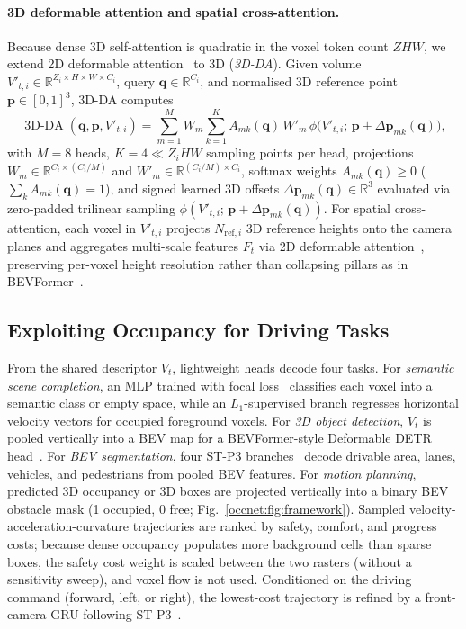 \paragraph{3D deformable attention and spatial cross-attention.} Because dense 3D self-attention is quadratic in the voxel token count $ZHW$, we extend 2D deformable attention~\cite{Zhu2021DeformableDD} to 3D (\emph{3D-DA}). Given volume $V'_{t,i}\in\mathbb{R}^{Z_i\times H\times W\times C_i}$, query $\boldsymbol{q}\in\mathbb{R}^{C_i}$, and normalised 3D reference point $\boldsymbol{p}\in[0,1]^3$, 3D-DA computes
\begin{equation}
  \operatorname{3D-DA}(\boldsymbol{q},\boldsymbol{p},V'_{t,i})
  = \sum_{m=1}^{M} W_m \sum_{k=1}^{K} A_{mk}(\boldsymbol{q})\, W'_m\, \phi\!\big(V'_{t,i};\,\boldsymbol{p}+\Delta\boldsymbol{p}_{mk}(\boldsymbol{q})\big),
  \label{occnet:eq:3dda}
\end{equation}
with $M=8$ heads, $K=4\ll Z_iHW$ sampling points per head, projections $W_m\in\mathbb{R}^{C_i\times(C_i/M)}$ and $W'_m\in\mathbb{R}^{(C_i/M)\times C_i}$, softmax weights $A_{mk}(\boldsymbol{q})\ge 0$ ($\sum_{k}A_{mk}(\boldsymbol{q})=1$), and signed learned 3D offsets $\Delta\boldsymbol{p}_{mk}(\boldsymbol{q})\in\mathbb{R}^3$ evaluated via zero-padded trilinear sampling $\phi(V'_{t,i};\,\boldsymbol{p}+\Delta\boldsymbol{p}_{mk}(\boldsymbol{q}))$. For spatial cross-attention, each voxel in $V'_{t,i}$ projects $N_{\text{ref},i}$ 3D reference heights onto the camera planes and aggregates multi-scale features $F_t$ via 2D deformable attention~\cite{Zhu2021DeformableDD}, preserving per-voxel height resolution rather than collapsing pillars as in BEVFormer~\cite{li2022bevformer}.

\subsection{Exploiting Occupancy for Driving Tasks}\label{occnet:sec:exploitation_of_occupancy}

From the shared descriptor $V_t$, lightweight heads decode four tasks. For \emph{semantic scene completion}, an MLP trained with focal loss~\cite{Lin2017FocalLF} classifies each voxel into a semantic class or empty space, while an $L_1$-supervised branch regresses horizontal velocity vectors for occupied foreground voxels. For \emph{3D object detection}, $V_t$ is pooled vertically into a BEV map for a BEVFormer-style Deformable DETR head~\cite{li2022bevformer,Zhu2021DeformableDD}. For \emph{BEV segmentation}, four ST-P3 branches~\cite{hu2022stp3} decode drivable area, lanes, vehicles, and pedestrians from pooled BEV features. For \emph{motion planning}, predicted 3D occupancy or 3D boxes are projected vertically into a binary BEV obstacle mask (1 occupied, 0 free; Fig.~\ref{occnet:fig:framework}). Sampled velocity-acceleration-curvature trajectories are ranked by safety, comfort, and progress costs; because dense occupancy populates more background cells than sparse boxes, the safety cost weight is scaled between the two rasters (without a sensitivity sweep), and voxel flow is not used. Conditioned on the driving command (forward, left, or right), the lowest-cost trajectory is refined by a front-camera GRU following ST-P3~\cite{hu2022stp3}.

